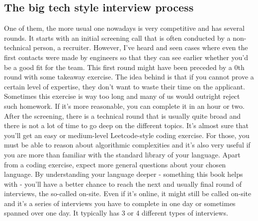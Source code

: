 \documentclass{report}
\begin{document}
    \subsection{The big tech style interview process}
    \bigbreak \noindent 
One of them, the more usual one nowadays is very competitive and has several rounds. It starts with an initial screening call that is often conducted by a non-technical person, a recruiter. However, I’ve heard and seen cases where even the first contacts were made by engineers so that they can see earlier whether you’d be a good fit for the team.
\bigbreak \noindent 
This first round might have been preceded by a 0th round with some takeaway exercise. The idea behind
is that if you cannot prove a certain level of expertise, they don’t want to waste their time on the
applicant. Sometimes this exercise is way too long and many of us would outright reject such homework.
If it’s more reasonable, you can complete it in an hour or two.
\bigbreak \noindent 
After the screening, there is a technical round that is usually quite broad and there is not a lot of time to
go deep on the different topics. It’s almost sure that you’ll get an easy or medium-level Leetcode-style
coding exercise. For those, you must be able to reason about algorithmic complexities and it’s also very
useful if you are more than familiar with the standard library of your language. Apart from a coding
exercise, expect more general questions about your chosen language.
\bigbreak \noindent 
By understanding your language deeper -
something this book helps with - you’ll have a better chance to reach the next and usually final round of
interviews, the so-called on-site. Even if it’s online, it might still be called on-site and it’s a series of
interviews you have to complete in one day or sometimes spanned over one day.
\bigbreak \noindent 
It typically has 3 or 4 different types of interviews.
\end{document}
